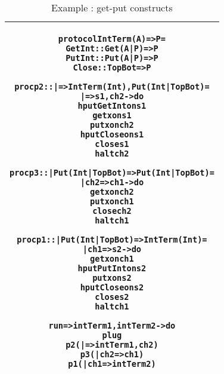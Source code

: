\documentclass[11pt]{article}
\newcommand{\<}{\langle}
\renewcommand{\>}{\rangle}
\begin{document}
\begin{table}[h!]
\begin{center}
\begin{tabular}{|c|} \hline
\begin{minipage}{5in}
{
\begin{alltt}


    protocol IntTerm (A) => P =
        GetInt    :: Get (A|P) => P 
        PutInt    :: Put (A|P) => P
        Close     :: TopBot    => P  


    proc p2 :: |  => IntTerm (Int),Put(Int|TopBot) =
        |  => s1,ch2 -> do 
            hput GetInt on s1
            get x on s1
            put x on ch2
            hput Close on s1
            close s1 
            halt ch2


    proc p3 :: |  Put (Int|TopBot) => Put (Int|TopBot) =
        | ch2 => ch1 -> do 
           get x on ch2
           put x on ch1 
           close ch2
           halt ch1

    proc p1 :: | Put (Int|TopBot) => IntTerm (Int) = 
         | ch1 => s2 -> do 
            get x on ch1 
            hput PutInt on s2 
            put x on s2 
            hput Close on s2 
            close s2
            halt ch1

    run => intTerm1,intTerm2 -> do 
        plug
          p2 ( | => intTerm1,ch2)  
          p3 ( | ch2 => ch1) 
          p1 ( | ch1 => intTerm2 )



\end{alltt}

} 
\end {minipage} 
\tabularnewline
\hline
\end{tabular}
\caption{Example : {\sf get-put} constructs}
\label{Conc : getputExample}
\end{center}
\end{table}
\end{document}
